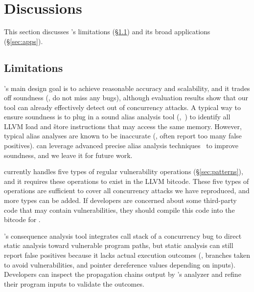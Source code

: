 \section{Discussions}\label{sec:discuss}

This section discusses \xxx's limitations (\S\ref{sec:limits}) and its broad 
applications (\S\ref{sec:apps}).

\subsection{Limitations}\label{sec:limits}

\xxx's main design goal is to achieve reasonable accuracy and scalability, 
and it trades off soundness (\ie, do not miss any bugs), although evaluation 
results show that our \xxx tool can already effectively detect \nbackendDetected out of \nreproduced 
concurrency attacks. A typical way to ensure soundness is to plug in a sound 
alias analysis tool (\eg,~\cite{bddbddb, dsa:pldi07}) to identify all LLVM 
\v{load} and \v{store} instructions that may access the same memory. However, 
typical alias analyses are known to be inaccurate (\eg, often report too 
many false positives). \xxx can leverage advanced precise alias analysis 
techniques~\cite{peregrine:sosp11, wu:pldi12, chimera:pldi12} to improve 
soundness, and we leave it for future work.

\xxx currently handles five types of regular vulnerability operations 
(\S\ref{sec:patterns}), and it requires these operations to exist in the LLVM 
bitcode. These five types of operations are sufficient to cover all 
\nreproduced concurrency attacks we have reproduced, and more types can be 
added. If developers are concerned about some third-party code that may contain 
vulnerabilities, they should compile this code into the bitcode for \xxx.

\xxx's consequence analysis tool integrates call stack of a concurrency bug to 
direct static analysis toward vulnerable program paths, but static analysis can 
still report false positives because it lacks actual execution outcomes 
(\eg, branches taken to avoid vulnerabilities, and pointer dereference values 
depending on inputs). Developers can inspect the propagation chains output by
\xxx's analyzer and refine their program inputs to validate the outcomes.




